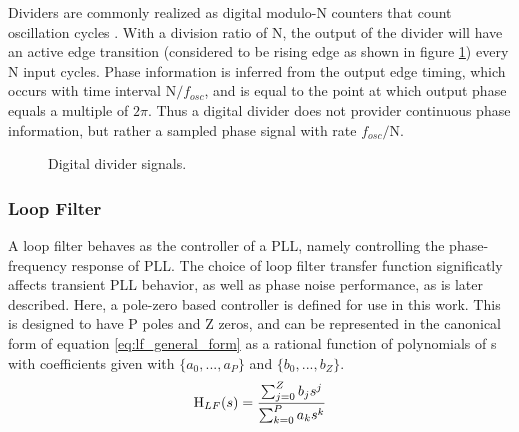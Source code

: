 			Dividers are commonly realized as digital modulo-N counters that count oscillation cycles \cite{weste_harris_2011}. With a division ratio of N, the output of the divider will have an active edge transition (considered to be rising edge as shown in figure \ref{fig:digital_div}) every N input cycles. Phase information is inferred from the output edge timing, which occurs with time interval N$/f_{osc}$, and is equal to the point at which output phase equals a multiple of $2\pi$. Thus a digital divider does not provider continuous phase information, but rather a sampled phase signal with rate $f_{osc}/$N. 
			\begin{figure}[htb!]
				\center
				\caption{Digital divider signals.}
				\label{fig:digital_div}
			\end{figure}


		\subsubsection{Loop Filter}
			A loop filter behaves as the controller of a PLL, namely controlling the phase-frequency response of PLL. The choice of loop filter transfer function significatly affects transient PLL behavior, as well as phase noise performance, as is later described. Here, a pole-zero based controller is defined for use in this work. This is designed to have P poles and Z zeros, and can be represented in the canonical form of equation \ref{eq:lf_general_form} as a rational function of polynomials of s with coefficients given with $\{a_0, ..., a_P\}$ and $\{b_0, ..., b_Z\}$.
			\begin{equation} \label{eq:lf_general_form}
				\textnormal{H}_{LF}(s) = \frac{\sum_{j=0}^Z b_js^j}{\sum_{k=0}^P a_ks^k}
			\end{equation}
			
